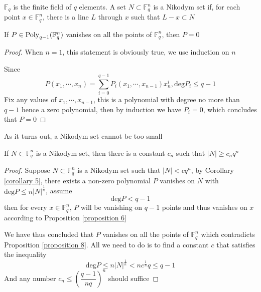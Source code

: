 \begin{definition}\label{definition 7}
$ \mathbb{F}_{q} $ is the finite field of $ q $ elements. A set $ N \subset \mathbb{F}_{q}^{n} $ is a Nikodym set if, for each point $ x \in \mathbb{F}_{q}^{n} $, there is a line $ L $ through $ x $ such that $ L-{x} \subset N $
\end{definition}

\begin{proposition}\label{proposition 8}
If $ P \in \operatorname{Poly}_{q-1}(\mathbb{F}_{q}^{n}) $ vanishes on all the points of $ \mathbb{F}_{q}^{n} $, then $ P = 0 $
\end{proposition}

\begin{proof}
When $ n = 1 $, this statement is obviously true, we use induction on $ n $ \par
Since 
$$ P(x_{1}, \cdots, x_{n}) = \sum_{i=0}^{q-1}P_{i}(x_{1}, \cdots, x_{n-1})x_{n}^{i}, \mathrm{deg}P_{i} \leq q-1 $$
Fix any values of $ x_{1}, \cdots, x_{n-1} $, this is a polynomial with degree no more than $ q-1 $ hence a zero polynomial, then by induction we have $ P_{i} = 0 $, which concludes that $ P = 0 $
\end{proof}

As it turns out, a Nikodym set cannot be too small

\begin{theorem}\label{theorem 9}
If $ N \subset \mathbb{F}_{q}^{n} $ is a Nikodym set, then there is a constant $ c_{n} $ such that 
$ |N| \geq c_{n}q^{n} $
\end{theorem}

\begin{proof}
Suppose $ N \subset \mathbb{F}_{q}^{n} $ is a Nikodym set such that $ |N| < cq^{n} $, by Corollary \ref{corollary 5}, there exists a non-zero polynomial $ P $ vanishes on $ N $ with $ \mathrm{deg}P \leq n|N|^{\frac{1}{n}} $, assume
$$ \mathrm{deg}P < q-1 $$
then for every $ x \in \mathbb{F}_{q}^{n} $, $ P $ will be vanishing on $ q-1 $ points and thus vanishes on $ x $ according to Proposition \ref{proposition 6} \par
We have thus concluded that $ P $ vanishes on all the points of $ \mathbb{F}_{q}^{n} $ which contradicts Proposition \ref{proposition 8}. All we need to do is to find a constant $ c $ that satisfies the inequality
$$ \mathrm{deg}P \leq n|N|^{\frac{1}{n}} < nc^{\frac{1}{n}}q \leq q-1 $$
And any number $ c_{n} \leq \left( \dfrac{q-1}{nq} \right)^{n} $ should suffice
\end{proof}

